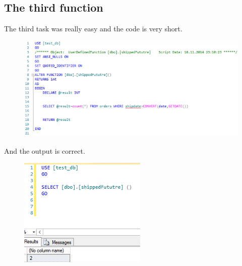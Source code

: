 \documentclass[english]{article}
\begin{document}
\subsection{The third function}
The third task was really easy and the code is very short.
\begin{figure}[H]
\centerline{\includegraphics[scale=0.8]{FunctionsSQLServer/thirdSource}}
\end{figure} 
And the output is correct.
\begin{figure}[H]
\centerline{\includegraphics[scale=0.8]{FunctionsSQLServer/thirdOutput}}
\end{figure}

\newpage
\end{document}
